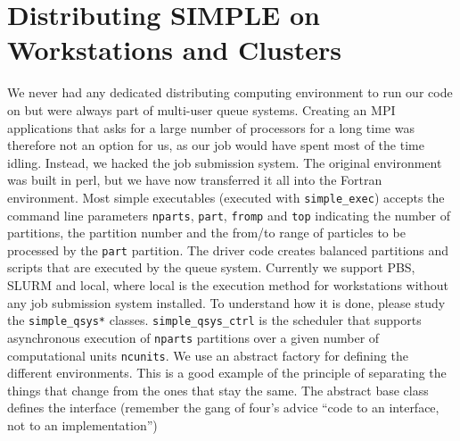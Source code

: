 \documentclass[a4paper,11pt]{article}
\begin{document}
\section{Distributing SIMPLE on Workstations and Clusters}
We never had any dedicated distributing computing environment to run our code on but were always part of multi-user queue systems. Creating an MPI applications that asks for a large number of processors for a long time was therefore not an option for us, as our job would have spent most of the time idling. Instead, we hacked the job submission system. The original environment was built in perl, but we have now transferred it all into the Fortran environment. Most simple executables (executed with \texttt{simple\_exec}) accepts the command line parameters \texttt{nparts}, \texttt{part}, \texttt{fromp} and \texttt{top} indicating the number of partitions, the partition number and the from/to range of particles to be processed by the \texttt{part} partition. The driver code creates balanced partitions and scripts that are executed by the queue system. Currently we support PBS, SLURM and local, where local is the execution method for workstations without any job submission system installed. To understand how it is done, please study the \texttt{simple\_qsys*} classes. \texttt{simple\_qsys\_ctrl} is the scheduler that supports asynchronous execution of \texttt{nparts} partitions over a given number of computational units \texttt{ncunits}. We use an abstract factory for defining the different environments. This is a good example of the principle of separating the things that change from the ones that stay the same. The abstract base class defines the interface (remember the gang of four's advice ``code to an interface, not to an implementation'')
\end{document}
